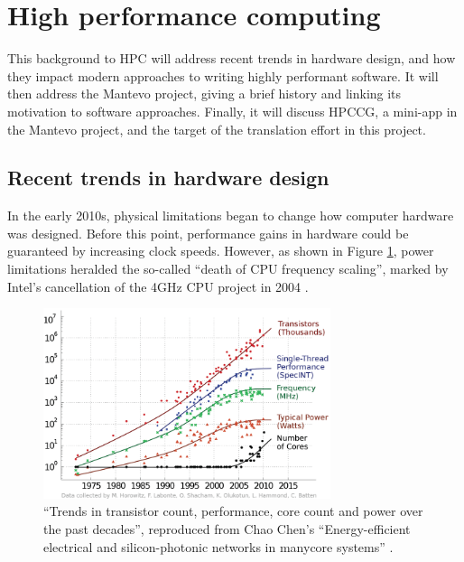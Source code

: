 \section{High performance computing}
\label{sec:hpc}

This background to \acrshort{HPC} will address recent trends in hardware design, and how they impact modern approaches to writing highly performant software. It will then address the Mantevo project, giving a brief history and linking its motivation to software approaches. Finally, it will discuss HPCCG, a \acrshort{mini-app} in the Mantevo project, and the target of the translation effort in this project.

\subsection{Recent trends in hardware design}
\label{ssec:hardware-design-trends}

In the early 2010s, physical limitations began to change how computer hardware was designed. Before this point, performance gains in hardware could be guaranteed by increasing clock speeds. However, as shown in Figure \ref{fig:scaling-trends-transistor-clock}, power limitations heralded the so-called ``death of CPU frequency scaling'', marked by Intel's cancellation of the 4GHz CPU project in 2004 \cite{markovLimitsFundamentalLimits2014}.

\begin{figure}[H]
    \centering
    \includegraphics[width=0.75\textwidth]{images/2_background/1-Trends-in-transistor-count-performance-core-count-and-power-over-the-past-decades.png}
    \caption{``Trends in transistor count, performance, core count and power over the past decades'', reproduced from Chao Chen's ``Energy-efficient electrical and silicon-photonic networks in manycore systems'' \cite{chenEnergyefficientElectricalSiliconphotonic2014}.}
    \label{fig:scaling-trends-transistor-clock}
\end{figure}


